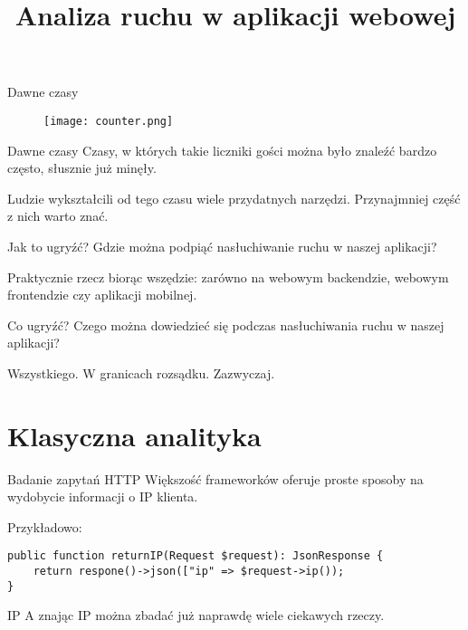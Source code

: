 

\title{Analiza ruchu w aplikacji webowej}



\begin{frame}{Dawne czasy}
	\begin{figure}[t]
		\centering
		\texttt{[image: counter.png]}
	\end{figure}
\end{frame}

\begin{frame}{Dawne czasy}
	Czasy, w których takie liczniki gości można było znaleźć bardzo często, słusznie już minęły.
	
	Ludzie wykształcili od tego czasu wiele przydatnych narzędzi. Przynajmniej część z nich warto znać.
\end{frame}

\begin{frame}{Jak to ugryźć?}
	Gdzie można podpiąć nasłuchiwanie ruchu w naszej aplikacji?
	
	Praktycznie rzecz biorąc wszędzie: zarówno na webowym backendzie, webowym frontendzie czy aplikacji mobilnej.
\end{frame}

\begin{frame}{Co ugryźć?}
	Czego można dowiedzieć się podczas nasłuchiwania ruchu w naszej aplikacji?
	
	Wszystkiego. W granicach rozsądku. Zazwyczaj.
\end{frame}

\section{Klasyczna analityka}

\begin{frame}[fragile]{Badanie zapytań HTTP}
	Większość frameworków oferuje proste sposoby na wydobycie informacji o IP klienta.
	
	Przykładowo:

\begin{lstlisting}
public function returnIP(Request $request): JsonResponse {
    return respone()->json(["ip" => $request->ip());
}
\end{lstlisting}
\end{frame}

\begin{frame}{IP}
	A znając IP można zbadać już naprawdę wiele ciekawych rzeczy.
\end{frame}

